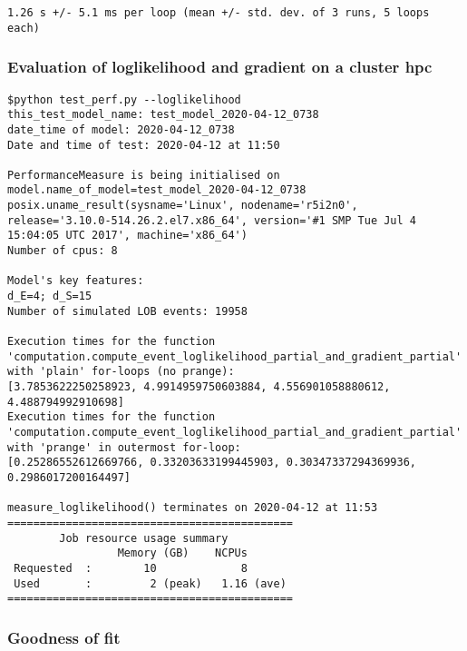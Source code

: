 \documentclass[10pt]{article}
\begin{document}
    \begin{Verbatim}[commandchars=\\\{\}, fontsize=\small]
1.26 s +/- 5.1 ms per loop (mean +/- std. dev. of 3 runs, 5 loops each)
    \end{Verbatim}

\subsubsection*{Evaluation of loglikelihood and gradient on a cluster hpc}    
\begin{tcolorbox}[breakable, size=fbox, boxrule=1pt, pad at break*=1mm,colframe=cellborder]    
\begin{Verbatim}[commandchars=\\\{\}, fontsize=\small]
 $python test_perf.py --loglikelihood
this_test_model_name: test_model_2020-04-12_0738
date_time of model: 2020-04-12_0738
Date and time of test: 2020-04-12 at 11:50

PerformanceMeasure is being initialised on model.name_of_model=test_model_2020-04-12_0738
posix.uname_result(sysname='Linux', nodename='r5i2n0', release='3.10.0-514.26.2.el7.x86_64', version='#1 SMP Tue Jul 4 15:04:05 UTC 2017', machine='x86_64')
Number of cpus: 8

Model's key features:
d_E=4; d_S=15
Number of simulated LOB events: 19958

Execution times for the function 'computation.compute_event_loglikelihood_partial_and_gradient_partial' with 'plain' for-loops (no prange):
[3.7853622250258923, 4.9914959750603884, 4.556901058880612, 4.488794992910698]
Execution times for the function 'computation.compute_event_loglikelihood_partial_and_gradient_partial' with 'prange' in outermost for-loop:
[0.25286552612669766, 0.33203633199445903, 0.30347337294369936, 0.2986017200164497]

measure_loglikelihood() terminates on 2020-04-12 at 11:53
============================================
        Job resource usage summary 
                 Memory (GB)    NCPUs
 Requested  :        10             8
 Used       :         2 (peak)   1.16 (ave)
============================================
\end{Verbatim}
\end{tcolorbox}


\subsubsection{Goodness of fit}
\end{document}
